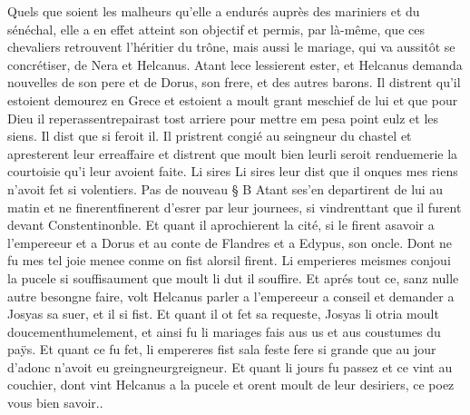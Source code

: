 \documentclass{article}
\begin{document}
\begin{pages}
               Quels que soient les malheurs qu'elle a endurés auprès des mariniers et du sénéchal, 
               elle a en effet atteint son objectif et permis, par là-même, que ces chevaliers retrouvent l'héritier du trône, mais aussi
               le mariage, qui va aussitôt se concrétiser, de Nera et Helcanus.
               Atant lece lessierent ester, 
               et Helcanus demanda nouvelles de son pere 
               et de Dorus, son frere, et des autres barons. 
               Il distrent qu’il estoient 
                  demourez en Grece et estoient a moult grant meschief de lui 
                  et que pour Dieu il reperassentrepairast tost 
                  arriere pour mettre 
                  em pesa point eulz 
                  et les siens. 
               Il dist que si feroit il. 
               Il pristrent congié au seingneur du 
                  chastel et apresterent leur 
               erreaffaire et 
               distrent que moult bien 
                  leurli seroit 
                  renduemerie la courtoisie qu’i leur avoient faite. 
               Li sires
                  Li sires leur dist que 
               il onques mes riens n’avoit fet si volentiers. \pend
            \pstart Pas de nouveau § B
               Atant ses'en departirent 
               de lui au matin et ne 
               finerentfinerent d'esrer par leur journees, 
               si vindrenttant que il furent 
               devant Constentinonble. Et quant il aprochierent 
               la cité, 
               si le firent asavoir a l’empereeur et a Dorus 
               et au conte de Flandres et 
               a Edypus, son oncle. Dont ne fu mes tel joie menee conme 
               on fist alorsil firent. 
               Li emperieres meismes conjoui la pucele 
               si souffisaument que moult li dut il souffire. 
               Et aprés tout ce, sanz nulle autre besongne faire, 
               volt Helcanus parler a l’empereeur a conseil 
               et demander a Josyas sa suer, 
               et il si fist. Et quant il ot fet sa requeste, 
               Josyas li otria moult 
               doucementhumelement, 
               et ainsi fu li mariages fais aus us et aus coustumes du paÿs. 
               Et quant ce fu fet, li empereres fist 
               sala feste fere si grande que au jour 
               d’adonc n’avoit eu greingneurgreigneur. 
                  Et quant li jours fu passez et ce vint au couchier, dont vint Helcanus a la pucele et orent moult de leur desiriers, 
                  ce poez vous bien savoir.. 

\end{pages}
\end{document}
